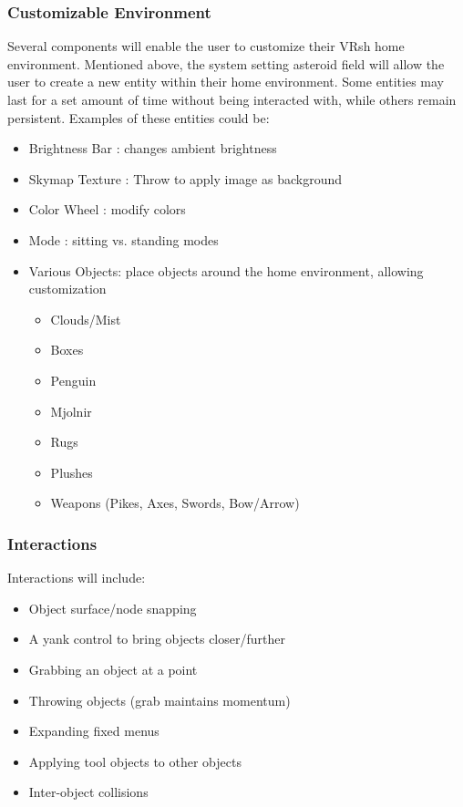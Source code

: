 \documentclass[titlepage,12pt]{article}
\newcommand\name{VRsh\xspace}
\begin{document}
\subsubsection{Customizable Environment}\label{sec:env}
Several components will enable the user to customize their \name home
environment. Mentioned above, the system setting asteroid field will 
allow the user to create a new entity within their home environment.
Some entities may last for a set amount of time without being interacted
with, while others remain persistent. Examples of these entities could be:
\begin{itemize}
    \item Brightness Bar : changes ambient brightness
    \item Skymap Texture : Throw to apply image as background
    \item Color Wheel    : modify colors
    \item Mode           : sitting vs. standing modes
    \item Various Objects: place objects around the home environment, 
    allowing customization
    \begin{itemize}
        \item Clouds/Mist
        \item Boxes
        \item Penguin
        \item Mjolnir
        \item Rugs
        \item Plushes
        \item Weapons (Pikes, Axes, Swords, Bow/Arrow)
    \end{itemize}
\end{itemize}

\subsubsection{Interactions}

Interactions will include:
\begin{itemize}
    \item Object surface/node snapping
    \item A yank control to bring objects closer/further
    \item Grabbing an object at a point
    \item Throwing objects (grab maintains momentum)
    \item Expanding fixed menus
    \item Applying tool objects to other objects
    \item Inter-object collisions
\end{itemize}
\end{document}
